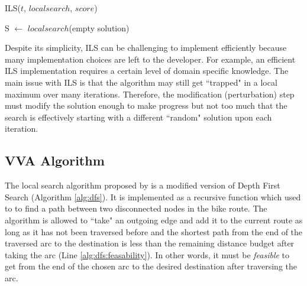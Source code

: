 \documentclass[honors]{union-cs-thesis}
\newcommand{\td}{\todo[inline]}
\begin{document}
%
%
\begin{algorithm}
\caption{ILS($t$, $localsearch$, $score$)}
S $\gets$ $localsearch$(empty solution)\;
\end{algorithm}

Despite its simplicity, ILS can be challenging to implement efficiently because many implementation choices are left to the developer. For example, an efficient ILS implementation requires a certain level of domain specific knowledge. The main issue with ILS is that the algorithm may still get ``trapped" in a local maximum over many iterations. Therefore, the modification (perturbation) step must modify the solution enough to make progress but not too much that the search is effectively starting with a different ``random" solution upon each iteration. 



\subsection{VVA Algorithm}
The local search algorithm proposed by \citeauthor{verbeeck2014extension} is a modified version of Depth First Search (Algorithm \ref{alg:dfs}). It is implemented as a recursive function which used to to find a path between two disconnected nodes in the bike route. The algorithm is allowed to ``take" an outgoing edge and add it to the current route as long as it has not been traversed before and the shortest path from the end of the traversed arc to the destination is less than the remaining distance budget after taking the arc (Line \ref{alg:dfs:feasability}). In other words, it must be \emph{feasible} to get from the end of the chosen arc to the desired destination after traversing the arc. 
\end{document}
